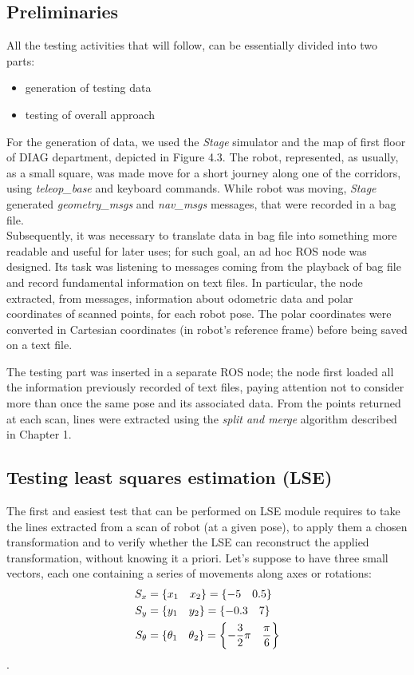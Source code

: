 \documentclass[a4paper, onecolumn]{report}
\begin{document}
\subsection{Preliminaries}
All the testing activities that will follow, can be essentially divided into two parts:
\begin{itemize}
	\item{generation of testing data}
	\item{testing of overall approach}
\end{itemize}
For the generation of data, we used the \emph{Stage} simulator and the map of first floor of DIAG department, depicted in Figure 4.3. The robot, represented, as usually, as a small square, was made move for a short journey along one of the corridors, using \emph{teleop\_base} and keyboard commands. While robot was moving, \emph{Stage} generated \emph{geometry\_msgs} and \emph{nav\_msgs} messages, that were recorded in a bag file. \\
Subsequently, it was necessary to translate data in bag file into something more readable and useful for later uses; for such goal, an ad hoc ROS node was designed. Its task was listening to messages coming from the playback of bag file and record fundamental information on text files. In particular, the node extracted, from messages, information about odometric data and polar coordinates of scanned points, for each robot pose. The polar coordinates were converted in Cartesian coordinates (in robot's reference frame) before being saved on a text file.

The testing part was inserted in a separate ROS node; the node first loaded all the information previously recorded of text files, paying attention not to consider more than once the same pose and its associated data. From the points returned at each scan, lines were extracted using the \emph{split and merge} algorithm described in Chapter 1.

\subsection{Testing least squares estimation (LSE)}
The first and easiest test that can be performed on LSE module requires to take the lines extracted from a scan of robot (at a given pose), to apply them a chosen transformation and to verify whether the LSE can reconstruct the applied transformation, without knowing it a priori.
Let's suppose to have three small vectors, each one containing a series of movements along axes or rotations:
\begin{equation}
	\begin{aligned}
		S_x &= \{x_1 \quad x_2\} = \{ -5 \quad 0.5\} \\ \notag
		S_y &= \{y_1 \quad y_2\} = \{-0.3 \quad 7\} \\ \notag
		S_\theta &= \{\theta_1 \quad \theta_2\} = \left\{-\frac{3}{2}\pi \quad \frac{\pi}{6}\right\} \notag
	\end{aligned}
\end{equation}.
\end{document}
